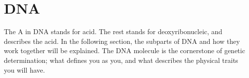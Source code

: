 
\section{DNA}
The A in DNA stands for acid. The rest stands for deoxyribonucleic, and describes the acid. In the following section, the subparts of DNA and how they work together will be explained. 
The DNA molecule is the cornerstone of genetic determination; what defines you as you, and what describes the physical traits you will have. 	
